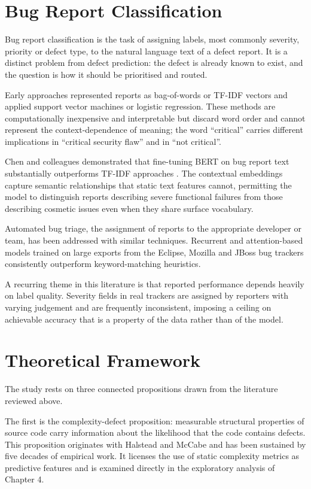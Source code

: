 \documentclass[12pt,a4paper,oneside]{report}
\begin{document}
\section{Bug Report Classification}

Bug report classification is the task of assigning labels, most commonly severity, priority or defect type, to the natural language text of a defect report. It is a distinct problem from defect prediction: the defect is already known to exist, and the question is how it should be prioritised and routed.

Early approaches represented reports as bag-of-words or TF-IDF vectors and applied support vector machines or logistic regression. These methods are computationally inexpensive and interpretable but discard word order and cannot represent the context-dependence of meaning; the word ``critical'' carries different implications in ``critical security flaw'' and in ``not critical''.

Chen and colleagues demonstrated that fine-tuning BERT on bug report text substantially outperforms TF-IDF approaches \cite{chen2022}. The contextual embeddings capture semantic relationships that static text features cannot, permitting the model to distinguish reports describing severe functional failures from those describing cosmetic issues even when they share surface vocabulary.

Automated bug triage, the assignment of reports to the appropriate developer or team, has been addressed with similar techniques. Recurrent and attention-based models trained on large exports from the Eclipse, Mozilla and JBoss bug trackers consistently outperform keyword-matching heuristics.

A recurring theme in this literature is that reported performance depends heavily on label quality. Severity fields in real trackers are assigned by reporters with varying judgement and are frequently inconsistent, imposing a ceiling on achievable accuracy that is a property of the data rather than of the model.

\section{Theoretical Framework}

The study rests on three connected propositions drawn from the literature reviewed above.

The first is the complexity-defect proposition: measurable structural properties of source code carry information about the likelihood that the code contains defects. This proposition originates with Halstead and McCabe and has been sustained by five decades of empirical work. It licenses the use of static complexity metrics as predictive features and is examined directly in the exploratory analysis of Chapter 4.
\end{document}
